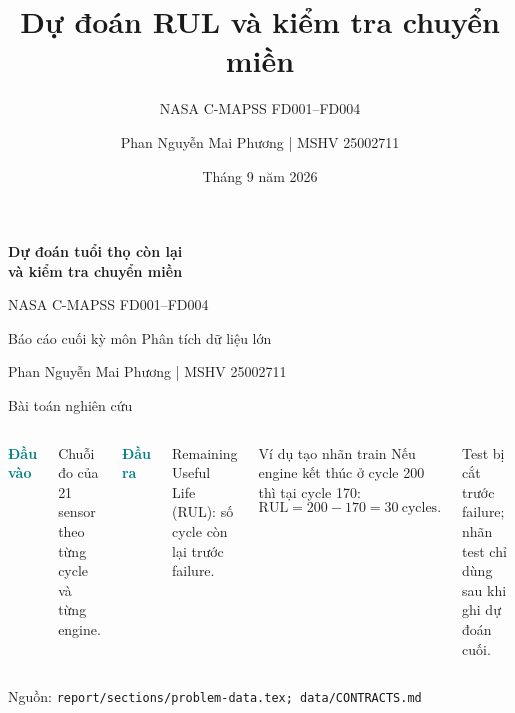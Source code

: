 \documentclass[aspectratio=169,professionalfonts]{beamer}
\title{Dự đoán RUL và kiểm tra chuyển miền}
\subtitle{NASA C-MAPSS FD001--FD004}
\author{Phan Nguyễn Mai Phương \quad | \quad MSHV 25002711}
\institute{Báo cáo cuối kỳ môn Phân tích dữ liệu lớn}
\date{Tháng 9 năm 2026}
\newcommand{\source}[1]{\vfill\hspace{0pt}\scriptsize\color{muted}Nguồn: \nolinkurl{#1}}
\begin{document}
{
\begin{frame}[plain]
  \vspace*{0.55cm}
  {\color{white}\fontsize{27}{31}\selectfont\bfseries Dự đoán tuổi thọ còn lại\\[0.12cm] và kiểm tra chuyển miền\par}
  \vspace{0.3cm}
  {\color{pale}\Large NASA C-MAPSS FD001--FD004\par}
  \vspace{0.55cm}
  {\color{white}\normalsize Báo cáo cuối kỳ môn Phân tích dữ liệu lớn\par}
  \vspace{0.25cm}
  {\color{white}\normalsize Phan Nguyễn Mai Phương \quad | \quad MSHV 25002711\par}
\end{frame}}

\begin{frame}{Bài toán nghiên cứu}
\begin{columns}[T,onlytextwidth]
\textcolor{teal}{\Large\bfseries Đầu vào}

Chuỗi đo của 21 sensor theo từng cycle và từng engine.

\vspace{0.8cm}
\textcolor{teal}{\Large\bfseries Đầu ra}

Remaining Useful Life (RUL): số cycle còn lại trước failure.

\begin{block}{Ví dụ tạo nhãn train}
Nếu engine kết thúc ở cycle 200 thì tại cycle 170:
\[
\mathrm{RUL}=200-170=30\ \text{cycles}.
\]
\end{block}

Test bị cắt trước failure; nhãn test chỉ dùng sau khi ghi dự đoán cuối.
\end{columns}
\source{report/sections/problem-data.tex; data/CONTRACTS.md}
\end{frame}
\end{document}
